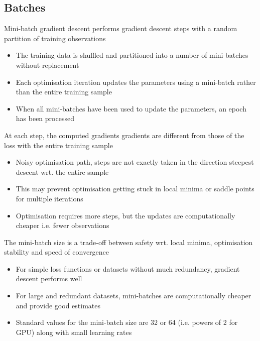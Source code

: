 \documentclass[c]{beamer}
\begin{document}
\subsection{Batches}

\begin{frame}{\secsubname}
	Mini-batch gradient descent performs gradient descent steps with a random partition of training observations
	\begin{itemize}
		\item The training data is shuffled and partitioned into a number of mini-batches without replacement
		\item Each optimisation iteration updates the parameters using a mini-batch rather than the entire training sample 
		\item When all mini-batches have been used to update the parameters, an epoch has been processed
	\end{itemize}
\end{frame}
 
\begin{frame}{\secsubname}
	At each step, the computed gradients gradients are different from those of the loss with the entire training sample
	\begin{itemize}
		\item Noisy optimisation path, steps are not exactly taken in the direction steepest descent wrt. the entire sample
		\item This may prevent optimisation getting stuck in local minima or saddle points for multiple iterations
		\item Optimisation requires more steps, but the updates are computationally cheaper i.e. fewer observations
	\end{itemize}
\end{frame}

\begin{frame}{\secsubname}
	The mini-batch size is a trade-off between safety wrt. local minima, optimisation stability and speed of convergence
	\begin{itemize}	
		\item For simple loss functions or datasets without much redundancy, gradient descent performs well
		\item For large and redundant datasets, mini-batches are computationally cheaper and provide good estimates
		\item Standard values for the mini-batch size are 32 or 64 (i.e. powers of 2 for GPU) along with small learning rates
	\end{itemize}
\end{frame}
\end{document}
